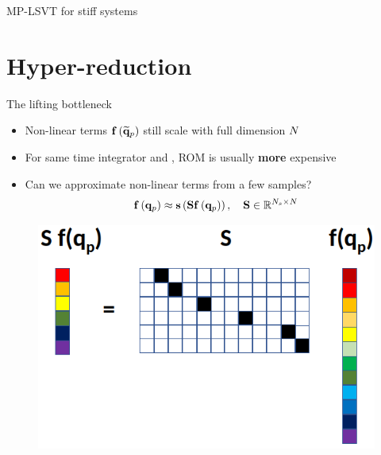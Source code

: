 \documentclass[]{beamer}
\begin{document}
\begin{frame}{MP-LSVT for stiff systems}
	
\end{frame}

\section*{Hyper-reduction}

\begin{frame}{The lifting bottleneck}
    \begin{itemize}
		\item Non-linear terms $\mathbf{f} \left(\mathbf{\widetilde{q}}_{p}\right)$ still scale with full dimension $N$
		\item For same time integrator and \dt, ROM is usually \textbf{more} expensive
		\item Can we approximate non-linear terms from a few samples?
		\begin{equation*}
			\mathbf{f} \left(\mathbf{q}_{p}\right) \approx \mathbf{s}\left(\mathbf{S} \mathbf{f} \left(\mathbf{q}_{p}\right)\right), \quad \mathbf{S} \in \mathbb{R}^{N_s \times N}
		\end{equation*}
	\end{itemize}
	\vspace{1em}
	\begin{figure}
		\centering
		\includegraphics[width=0.55\linewidth]{theory/samplingHelperVis.png}
	\end{figure}
\end{frame}
\end{document}
